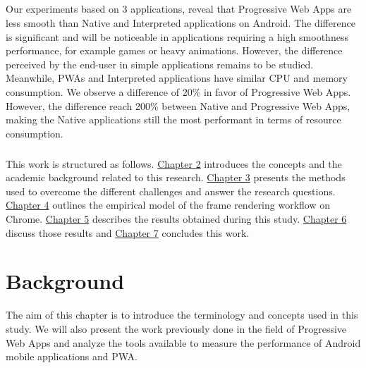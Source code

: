 \documentclass{kththesis}
\begin{document}
\paragraph{}
Our experiments based on 3 applications, reveal that Progressive Web Apps are less smooth than Native and Interpreted applications on Android. The difference is significant and will be noticeable in applications requiring a high smoothness performance, for example games or heavy animations. However, the difference perceived by the end-user in simple applications remains to be studied. Meanwhile, PWAs and Interpreted applications have similar CPU and memory consumption. We observe a difference of 20\% in favor of Progressive Web Apps. However, the difference reach 200\% between Native and Progressive Web Apps, making the Native applications still the most performant in terms of resource consumption. 

\paragraph{}
This work is structured as follows. \hyperref[ch:background]{Chapter 2} introduces the concepts and the academic background related to this research. \hyperref[ch:methodology]{Chapter 3} presents the methods used to overcome the different challenges and answer the research questions. \hyperref[ch:model]{Chapter 4} outlines the empirical model of the frame rendering workflow on Chrome. \hyperref[ch:results]{Chapter 5} describes the results obtained during this study. \hyperref[ch:discussion]{Chapter 6} discuss those results and \hyperref[ch:conclusion]{Chapter 7} concludes this work. 


\chapter{Background}
\label{ch:background}

The aim of this chapter is to introduce the terminology and concepts used in this study. We will also present the work previously done in the field of Progressive Web Apps and analyze the tools available to measure the performance of Android mobile applications and PWA.
\end{document}
